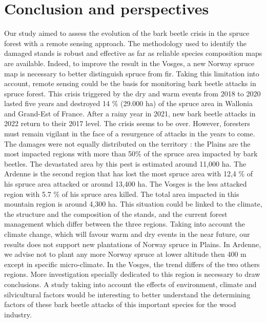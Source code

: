 \documentclass[3p,procedia]{elsarticle}
\begin{document}
\section{Conclusion and perspectives}
Our study aimed to assess the evolution of the bark beetle crisis in the spruce forest with a remote sensing approach.
The methodology used to identify the damaged stands is robust and effective as far as reliable species composition maps are available.
Indeed, to improve the result in the Vosges, a new Norway spruce map is necessary to better distinguish spruce from fir.
Taking this limitation into account, remote sensing could be the basis for monitoring bark beetle attacks in spruce forest.
This crisis triggered by the dry and warm events from 2018 to 2020 lasted five years and destroyed 14 \% (29.000 ha) of the spruce area in Wallonia and Grand-Est of France.
After a rainy year in 2021, new bark beetle attacks in 2022 return to their 2017 level. The crisis seems to be over. However, foresters must remain vigilant in the face of a resurgence of attacks in the years to come.   
The damages were not equally distributed on the territory : the Plains are the most impacted regions with more than 50\% of the spruce area impacted by bark beetles.
The devastated area by this pest is estimated around 11,000 ha.
The Ardenne is the second region that has lost the most spruce area with  12,4 \% of his spruce area attacked or around 13,400 ha. 
The Vosges is the less attacked region with 5.7 \% of his spruce area killed. The total area impacted in this mountain region is around 4,300 ha.
This situation could be linked to the climate, the structure and the composition of the stands, and the current forest management which differ between the three regions.
Taking into account the climate change, which will favour warm and dry events in the near future, our results does not support new plantations of Norway spruce in Plains.
In Ardenne, we advise not to plant any more Norway spruce at lower altitude then 400 m except in specific micro-climate.
In the Vosges, the trend differs of the two others regions.
More investigation specially dedicated to this region is necessary to draw conclusions.
A study taking into account the effects of environment, climate and silvicultural factors would be interesting to better understand the determining factors of these bark beetle attacks of this important species for the wood industry.

\end{document}

